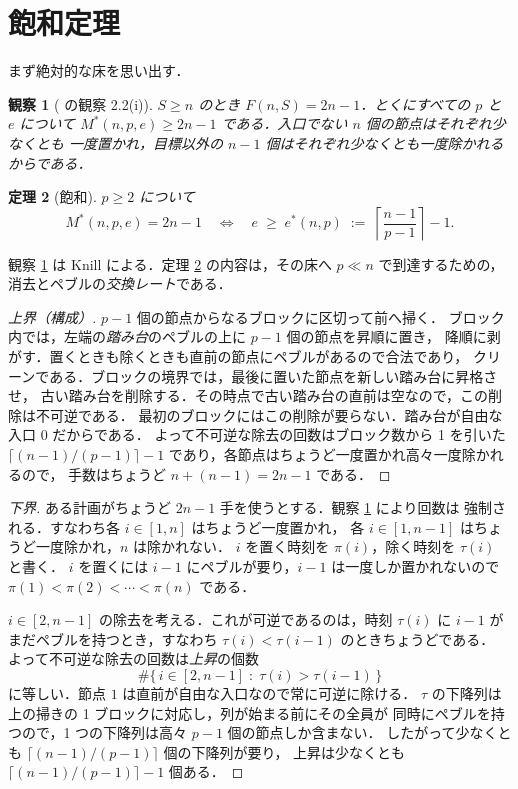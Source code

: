 \documentclass[a4paper,11pt]{jsarticle}
\newtheorem{theorem}{定理}
\newtheorem{observation}[theorem]{観察}
\theoremstyle{definition}
\newcommand{\Mstar}{M^{*}}
\newcommand{\estar}{e^{*}}
\begin{document}
\section{飽和定理}\label{sec:sat}
まず絶対的な床を思い出す．

\begin{observation}[\cite{Knill95} の観察 2.2(i)]\label{obs:floor}
$S \ge n$ のとき $F(n,S) = 2n-1$．とくにすべての $p$ と $e$ について
$\Mstar(n,p,e) \ge 2n-1$ である．入口でない $n$ 個の節点はそれぞれ少なくとも
一度置かれ，目標以外の $n-1$ 個はそれぞれ少なくとも一度除かれるからである．
\end{observation}

\begin{theorem}[飽和]\label{thm:A}
$p \ge 2$ について
\[
  \Mstar(n,p,e) = 2n-1
  \quad\Longleftrightarrow\quad
  e \;\ge\; \estar(n,p) \;:=\; \left\lceil \frac{n-1}{p-1} \right\rceil - 1 .
\]
\end{theorem}

観察 \ref{obs:floor} は Knill による．定理 \ref{thm:A} の内容は，その床へ
$p \ll n$ で到達するための，消去とペブルの\emph{交換レート}である．

\begin{proof}[上界（構成）]
$p-1$ 個の節点からなるブロックに区切って前へ掃く．
ブロック内では，左端の\emph{踏み台}のペブルの上に $p-1$ 個の節点を昇順に置き，
降順に剥がす．置くときも除くときも直前の節点にペブルがあるので合法であり，
クリーンである．ブロックの境界では，最後に置いた節点を新しい踏み台に昇格させ，
古い踏み台を削除する．その時点で古い踏み台の直前は空なので，この削除は不可逆である．
最初のブロックにはこの削除が要らない．踏み台が自由な入口 $0$ だからである．
よって不可逆な除去の回数はブロック数から 1 を引いた
$\lceil (n-1)/(p-1)\rceil - 1$ であり，各節点はちょうど一度置かれ高々一度除かれるので，
手数はちょうど $n + (n-1) = 2n-1$ である．
\end{proof}

\begin{proof}[下界]
ある計画がちょうど $2n-1$ 手を使うとする．観察 \ref{obs:floor} により回数は
強制される．すなわち各 $i \in [1,n]$ はちょうど一度置かれ，
各 $i \in [1,n-1]$ はちょうど一度除かれ，$n$ は除かれない．
$i$ を置く時刻を $\pi(i)$，除く時刻を $\tau(i)$ と書く．
$i$ を置くには $i-1$ にペブルが要り，$i-1$ は一度しか置かれないので
$\pi(1) < \pi(2) < \cdots < \pi(n)$ である．

$i \in [2,n-1]$ の除去を考える．これが可逆であるのは，時刻 $\tau(i)$ に
$i-1$ がまだペブルを持つとき，すなわち $\tau(i) < \tau(i-1)$ のときちょうどである．
よって不可逆な除去の回数は\emph{上昇}の個数
\[
  \#\{\, i \in [2,n-1] \;:\; \tau(i) > \tau(i-1) \,\}
\]
に等しい．節点 $1$ は直前が自由な入口なので常に可逆に除ける．
$\tau$ の下降列は上の掃きの 1 ブロックに対応し，列が始まる前にその全員が
同時にペブルを持つので，1 つの下降列は高々 $p-1$ 個の節点しか含まない．
したがって少なくとも $\lceil (n-1)/(p-1)\rceil$ 個の下降列が要り，
上昇は少なくとも $\lceil (n-1)/(p-1)\rceil - 1$ 個ある．
\end{proof}
\end{document}

